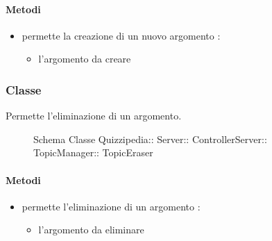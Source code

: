 \paragraph{Metodi}
\begin{itemize}
\item {}
\newline
permette la creazione di un nuovo argomento
\newline
{} :
\begin{itemize}
\item {}
\newline
l'argomento da creare
\end{itemize}
\end{itemize}
\subsubsection{Classe }
Permette l'eliminazione di un argomento.
\begin{figure}[H]
\centering
\noindent{}
\caption[Schema Classe TopicEraser]{Schema Classe Quizzipedia:: Server:: ControllerServer:: TopicManager:: TopicEraser}
\end{figure}
\paragraph{Metodi}
\begin{itemize}
\item {}
\newline
permette l'eliminazione di un argomento
\newline
{} :
\begin{itemize}
\item {}
\newline
l'argomento da eliminare
\end{itemize}
\end{itemize}
